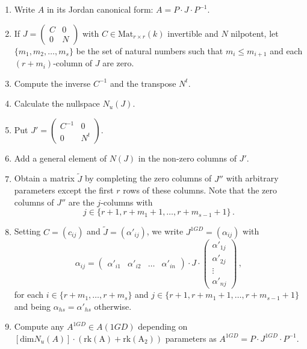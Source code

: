 \documentclass[10pt,a4paper]{amsart}
\theoremstyle{plain}
\theoremstyle{remark}
\numberwithin{equation}{section} \numberwithin{defn}{section}
\begin{document}
\begin{enumerate}

\item Write $A$ in its Jordan canonical form: $A = P\cdot J \cdot P^{-1}$. \medskip

\item If $J = \begin{pmatrix} C & 0 \\ 0 & N \end{pmatrix}$ with $C\in \text{Mat}_{r\times r} (k)$ invertible and $N$ nilpotent, let $\{m_1, m_2, \dots, m_s\}$ be the set of natural numbers such that $m_i \leq m_{i+1}$ and each $(r+m_i)$-column of $J$ are zero.  \smallskip

\item Compute the inverse $C^{-1}$ and the transpose $N^t.$

\item Calculate the nullspace $N_u(J)$.\smallskip

\item Put $J' = \begin{pmatrix} C^{-1} & 0 \\ 0 & N^t \end{pmatrix}$.

\item\label{eq: item6enumer} Add a general element of $N(J)$ in the non-zero columns of $J'.$ 

\item Obtain a matrix $\tilde {J}$ by completing the zero columns of $J''$ with arbitrary parameters except the first $r$ rows of these columns. \noindent Note that the zero columns of $J''$ are the $j$-columns with $$j\in \{ r+ 1, r+ m_1 +1, \dots, r+ m_{s-1} +1\}\, .$$

\item Setting $C = (c_{ij})$ and ${\tilde J} = (\alpha'_{ij})$, we write $J^{1GD} = (\alpha_{ij})$ with $$\alpha_{ij} = \begin{pmatrix} \alpha'_{i1} & \alpha'_{i2} & \dots & \alpha'_{in} \end{pmatrix} \cdot J \cdot \begin{pmatrix} \alpha'_{1j} \\ \alpha'_{2j} \\ \vdots \\ \alpha'_{nj} \end{pmatrix}  \, ,$$\noindent for each $i\in \{ r+ m_1, \dots, r+ m_{s}\}$ and $j\in \{ r+ 1, r+ m_1 +1, \dots, r+ m_{s-1} +1\}$ and being $\alpha_{hs} = \alpha'_{hs}$ otherwise. \medskip

\item Compute any $A^{1GD} \in A(1GD)$ depending on $[\mathrm{dim }N_u(A)]\cdot (\mathrm{rk (A)}+\mathrm{rk (A_2)})$ parameters as $A^{1GD} = P\cdot J^{1GD}\cdot P^{-1}$.
\end{enumerate} 
\end{document}
